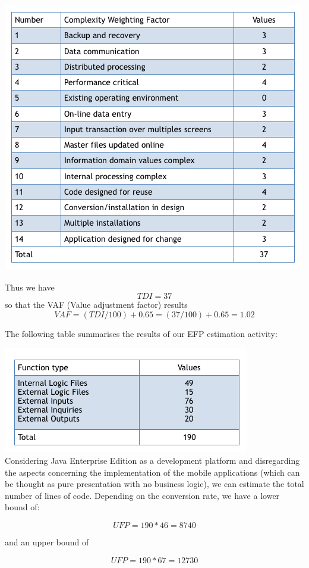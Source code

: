 \documentclass{article}
\begin{document}
\begin{flushleft}
\includegraphics[scale=0.5]{AFP}

Thus we have 
\[TDI = 37\]
so that the VAF (Value adjustment factor) results
\[VAF = (TDI/100) +0.65 = (37 /100) + 0.65= 1.02 \]


The following table summarises the results of our EFP estimation activity:

\includegraphics[scale=0.5]{FP} \\

Considering Java Enterprise Edition as a development platform and disregarding the aspects concerning the implementation of the mobile applications (which can be thought as pure presentation with no business logic), we can estimate the total number of lines of code.
Depending on the conversion rate, we have a lower bound of:

\[ UFP= 190 * 46 = 8740 \]


and an upper bound of

\[ UFP = 190 * 67 = 12730 \]


\end{flushleft}
\end{document}
